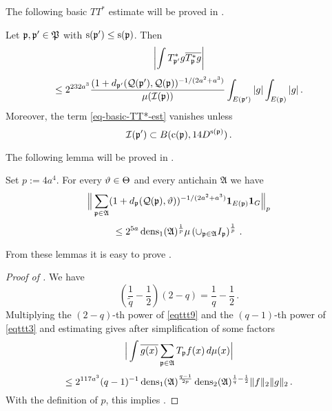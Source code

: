 The following basic $TT^*$ estimate will be proved in .
\begin{lemma}
    \label{tile-correlation}
    \leanok
    Let ${\mathfrak p}, {\mathfrak p}'\in {\mathfrak P}$ with
    ${\mathrm{s}}({{\mathfrak p}'})\leq {\mathrm{s}}({{\mathfrak p}})$.
    Then
    \begin{equation}
        \label{eq-basic-TT*-est}
        \left|\int T^*_{{\mathfrak p}'}g\overline{T^*_{{\mathfrak p}}g}\right|
    \end{equation}
    \begin{equation}
        \le 2^{232a^3}\frac{(1+d_{{\mathfrak p}'}({\mathcal{Q}}({\mathfrak p}'), {\mathcal{Q}}({\mathfrak p}))^{-1/(2a^2+a^3)}}{\mu({\mathcal{I}}({\mathfrak p}))}\int_{E({\mathfrak p}')}|g|\int_{E({\mathfrak p})}|g|\,.
    \end{equation}
    Moreover, the term \eqref{eq-basic-TT*-est} vanishes unless
    \begin{equation}
        {\mathcal{I}}({\mathfrak p}') \subset B({\mathrm{c}}({\mathfrak p}), 14D^{{\mathrm{s}}({\mathfrak p})})\, .
    \end{equation}
\end{lemma}

The following lemma will be proved in .
\begin{lemma}
    \label{antichain-tile-count}
\leanok
{}
    Set $p:=4a^4$. For every ${\vartheta}\in{\Theta}$ and every antichain $\mathfrak{A}$ we have
    \begin{equation}
        \label{eq-antichain-Lp}
        \Big\|\sum_{{\mathfrak p}\in\mathfrak{A}}(1+d_{{\mathfrak p}}({\mathcal{Q}}({\mathfrak p}), {\vartheta}))^{-1/(2a^2+a^3)}\mathbf{1}_{E({\mathfrak p})}\mathbf{1}_G\Big\|_{p}
    \end{equation}
    \begin{equation}
        \le
        2^{5a}\operatorname{\operatorname{dens}}_1(\mathfrak{A})^{\frac 1p}\mu\left(\cup_{{\mathfrak p}\in\mathfrak{A}}I_{{\mathfrak p}}\right)^{\frac 1p}\, .
    \end{equation}
\end{lemma}

From these lemmas it is easy to prove .
\begin{proof}[Proof of ]
\leanok
We have
\begin{equation}
    \left(\frac 1{\tilde{q}} -\frac 12\right) (2-q)= \frac 1q -\frac 12\,.
\end{equation}
Multiplying the $(2-q)$-th power of \eqref{eqttt9} and the $(q-1)$-th power of \eqref{eqttt3}
and estimating gives after simplification of some factors
\begin{equation}\label{eqttt8}
    \Big|\int \overline{g(x)} \sum_{{\mathfrak p} \in \mathfrak{A}} T_{{\mathfrak p}} f(x)\, d\mu(x)\Big|
\end{equation}
 \begin{equation}
    \le 2^{117a^3}(q-1)^{-1} \operatorname{\operatorname{dens}}_1(\mathfrak{A})^{\frac {q-1}{2p}}\operatorname{\operatorname{dens}}_2(\mathfrak{A})^{\frac 1{q}-\frac 12} \|f\|_2\|g\|_2\, .
\end{equation}
With the definition of $p$, this implies
.
\end{proof}


